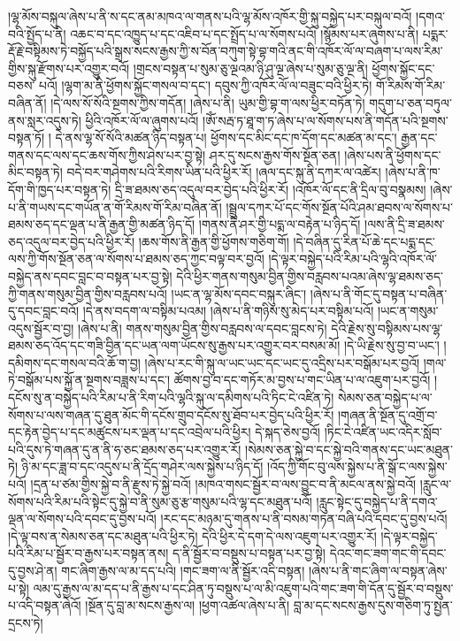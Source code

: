 །ལྷ་མོས་བསྐུལ་ཞེས་པ་ནི་ས་དང་ནམ་མཁའ་ལ་གནས་པའི་ལྷ་མོས་འཁོར་གྱི་སྐུ་བསྐྱེད་པར་བསྐུལ་བའོ། །དགའ་བའི་སྤྱོད་པ་ནི། འཆང་བ་དང་འཁྱུད་པ་དང་འཇིབ་པ་དང་སྤྲོད་པ་ལ་སོགས་པའོ། །སྙོམས་པར་ཞུགས་པ་ནི། པདྨར་རྡོ་རྗེ་བསྟིམས་ཏེ་བསྐྱོད་པའི་སྒྲས་སངས་རྒྱས་ཀྱི་ས་བོན་བཀུག་སྟེ་བྷ་གའི་ནང་གི་འཁོར་ལོ་ལ་བཞག་པ་ལས་རིམ་གྱིས་སྐུ་རྫོགས་པར་འགྱུར་བའོ། །གྲངས་བསྟན་པ་སུམ་ཅུ་ལྔའམ་ཉི་ཤུ་ལྔ་ཞེས་པ་སུམ་ཅུ་ལྔ་ནི། ཕྱོགས་སྐྱོང་དང་བཅས་​ པའོ། །ལྷག་མ་ནི་ཕྱོགས་སྐྱོང་གསལ་བ་དང་། དབུས་ཀྱི་འཁོར་ལོ་ལ་བཟུང་བའི་ཕྱིར་ཏེ། {གོ་རིམས་གོ་རིམ་}བཞིན་ནོ། །དེ་ལས་སོ་སོའི་སྔགས་ཀྱིས་གདོན། །ཞེས་པ་ནི། ཡུམ་གྱི་བྷ་ག་ལས་ཕྱིར་བཏོན་ཏེ། གདུག་པ་ཅན་བཏུལ་ནས་སླར་འདུས་ཏེ། ཕྱིའི་འཁོར་ལོ་ལ་ཞུགས་པའོ། །ཨོཾ་སརྦ་ཏ་ཐཱ་ག་ཏ་ཞེས་པ་ལ་སོགས་པས་ནི་གདོན་པའི་སྔགས་བསྟན་ཏོ། །
དེ་ནས་ལྷ་སོ་སོའི་མཚན་ཉིད་བསྟན་པ། ཕྱོགས་དང་མིང་དང་ཁ་དོག་དང་མཚན་མ་དང་། རྒྱན་དང་གནས་དང་ལས་དང་ཆས་གོས་ཀྱིས་ཤེས་པར་བྱ་སྟེ། ཤར་དུ་སངས་རྒྱས་གོས་སྔོན་ཅན། །ཞེས་པས་ནི་ཕྱོགས་དང་མིང་བསྟན་ཏེ། བདེ་བར་གཤེགས་པའི་རིགས་ཡིན་པའི་ཕྱིར་རོ། །ཞལ་དང་སྐུ་ནི་དཀར་ལ་འཚེར། །ཞེས་པ་ནི་ཁ་དོག་གི་ཁྱད་པར་བསྟན་ཏེ། དྲི་ཟ་ཐམས་ཅད་འདུལ་བར་བྱེད་པའི་ཕྱིར་རོ། །འཁོར་ལོ་དང་ནི་དྲིལ་བུ་བསྣམས། །ཞེས་པ་ནི་གཡས་དང་གཡོན་ན་{གོ་རིམས་གོ་རིམ་}བཞིན་ནོ། །སྦྲུལ་དཀར་པོ་དང་གོས་སྔོན་པོའི་ཤམ་ཐབས་ལ་སོགས་པ་ཐམས་ཅད་དང་ལྡན་པ་ནི་རྒྱན་གྱི་མཚན་ཉིད་དོ། །གནས་ནི་ཤར་གྱི་པདྨ་ལ་བརྟེན་པ་ཉིད་དོ། །ལས་ནི་དྲི་ཟ་ཐམས་ཅད་འདུལ་བར་བྱེད་པའི་ཕྱིར་རོ། །ཆས་གོས་ནི་རྒྱན་གྱི་ཕྱོགས་གཅིག་གོ། །དེ་བཞིན་དུ་རིན་པོ་ཆེ་དང་པདྨ་དང་ལས་ཀྱི་གོས་སྔོན་ཅན་ལ་སོགས་པ་ཐམས་ཅད་ཀྱང་བལྟ་བར་བྱའོ། །དེ་ལྟར་བསྐྱེད་པའི་རིམ་པའི་ལྷའི་འཁོར་ལོ་བསྐྱེད་ནས་དབང་བླང་བ་བསྟན་པར་བྱ་སྟེ། དེའི་ཕྱིར་གནས་གསུམ་བྱིན་གྱིས་བརླབས་པའམ་ཞེས་ལྷ་ཐམས་ཅད་ཀྱི་གནས་གསུམ་བྱིན་གྱིས་བརླབས་པའོ། །ཡང་ན་ལྷ་མོས་དབང་བསྐུར་ཞིང་། །ཞེས་པ་ནི་གོང་དུ་བསྟན་པ་བཞིན་དུ་དབང་བླང་བའོ། །དེ་ནས་བདག་ལ་བསྟིམ་པའམ། །ཞེས་པ་ནི་གཉིས་སུ་མེད་པར་བསྟིམ་པའོ། །ཡང་ན་གསུམ་འདུས་སྦྱོར་བ་བྱ། །ཞེས་པ་ནི། གནས་གསུམ་བྱིན་གྱིས་བརླབས་ལ་དབང་བླངས་ཏེ། དེའི་རྗེས་སུ་བསྟིམས་པས་ལྷ་ཐམས་ཅད་འོད་དང་གཟི་བྱིན་དང་ཡན་ལག་ཡོངས་སུ་རྒྱས་པར་འགྱུར་བར་བསམ་མོ། །དེ་ཡི་རྗེས་སུ་བྱ་བ་ཡང་། །དམིགས་དང་གསལ་བའི་ཆོ་ག་བྱ། །ཞེས་པ་རང་གི་སྐུ་ལ་ཡང་​ ཡང་དང་ཡང་དུ་འདྲིས་པར་བསྒོམ་པར་བྱའོ། །གལ་ཏེ་བསྒོམ་པས་སྐྱོ་ན་སྔགས་བཟླས་པ་དང་། ཚོགས་བྱ་བ་དང་གཏོར་མ་བྱས་པ་གང་ཡིན་པ་ལ་འཇུག་པར་བྱའོ། །དངོས་སུ་ན་བསྐྱེད་པའི་རིམ་པ་ནི་རིག་པའི་ལྷའི་སྐུ་ལ་དམིགས་པའི་ཏིང་ངེ་འཛིན་ཏེ། སེམས་ཅན་བསྐྱེད་པ་ལ་སོགས་པ་ལས་གཞན་དུ་ཐུན་མོང་གི་དངོས་གྲུབ་དངོས་སུ་ཐོབ་པར་བྱེད་པའི་ཕྱིར་རོ། །གཞན་ནི་སྔོན་དུ་འགྲོ་བ་དང་རྟེན་བྱེད་པ་དང་མཚུངས་པར་ལྡན་པ་དང་འབྲེལ་པའི་ཕྱིར། དེ་སྐད་ཅེས་བྱའོ། །ཏིང་ངེ་འཛིན་ཡང་འདིར་སློབ་པའི་དུས་ཏེ་གཞན་དུ་ན་ནི་ཧ་ཅང་ཐམས་ཅད་པར་འགྱུར་རོ། །སེམས་ཅན་སྐྱེ་བ་དང་སྐྱེ་བའི་གནས་དང་ཡང་མཐུན་ཏེ། ཉི་མ་དང་ཟླ་བ་དང་འདུས་པ་ནི་དྲོད་གཤེར་ལས་སྐྱེས་པ་ཉིད་དོ། །འོད་ཀྱི་གོང་བུ་ལས་སྐྱེས་པ་ནི་སྒོ་ང་ལས་སྐྱེས་པའོ། །དྲན་པ་ཙམ་གྱིས་སྐྱེ་བ་ནི་རྫུས་ཏེ་སྐྱེ་བའོ། །མཁའ་གསང་སྦྱོར་བ་ལས་བྱུང་བ་ནི་མངལ་ནས་སྐྱེ་བའོ། །རླུང་ལ་སོགས་པའི་རིམ་པའི་སྟེང་དུ་སྐྱེ་བ་ནི་སུམ་ཅུ་རྩ་གསུམ་པའི་ལྷ་དང་མཐུན་པའོ། །རླུང་སྟེང་དུ་བསྐྱེད་པ་ནི་དགའ་ལྡན་ལ་སོགས་པའི་དབང་དུ་བྱས་པའོ། །རང་དང་མཉམ་དུ་གནས་པ་ནི་བསམ་གཏན་བཞི་པའི་དབང་དུ་བྱས་པའོ། །དེ་ལྟ་བས་ན་སེམས་ཅན་དང་མཐུན་པའི་ཕྱིར་ཏེ། དེའི་ཕྱིར་དེ་དག་དེ་ལས་འཇུག་པར་འགྱུར་རོ། །དེ་ལྟར་བསྐྱེད་པའི་རིམ་པ་སྦྱོར་བ་རྒྱས་པར་བསྟན་ནས། ད་ནི་སྦྱོར་བ་བསྡུས་པ་བསྟན་པར་བྱ་སྟེ། དེའང་གང་ཟག་གང་གི་དབང་དུ་བྱས་ཤེ་ན། གང་ཞིག་རྒྱས་ལ་མ་དད་པའི། །གང་ཟག་ལ་ནི་སྦྱོར་འདི་བསྟན། །ཞེས་པ་ནི་གང་ཞིག་ལ་བསྟན་ཞེས་པ་སྟེ། ལམ་དུ་རྒྱས་ལ་མ་དད་པ་ནི་རྒྱས་པ་དང་ཤིན་ཏུ་བསྡུས་པ་ལ་མི་འཇུག་པའི་གང་ཟག་གི་དོན་དུ་སྦྱོར་བ་བསྡུས་པ་འདི་བསྟན་ཞེའོ། །སྔོན་དུ་བླ་མ་སངས་རྒྱས་ལ། །ཕྱག་འཚལ་ཞེས་པ་ནི། བླ་མ་དང་སངས་རྒྱས་དུས་གཅིག་ཏུ་སྤྱན་དྲངས་ཏེ། 